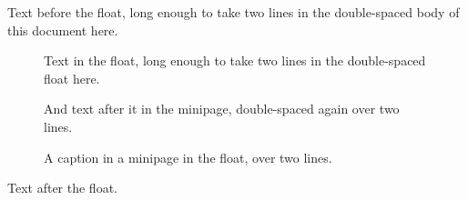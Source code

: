 \documentclass{article}
\begin{document}
Text before the float, long enough to take two lines in the double-spaced body of this document here.
\begin{figure}[H]
\centering
\begin{minipage}{0.6\textwidth}
Text in the float, long enough to take two lines in the double-spaced float here.
\end{minipage}
\caption{A caption in the float, long enough to take two lines in the float, single-spaced by caption.sty.}
\begin{minipage}{0.45\textwidth}
\caption{A caption in a minipage in the float, over two lines.}
And text after it in the minipage, double-spaced again over two lines.
\end{minipage}
\end{figure}
Text after the float.
\end{document}
